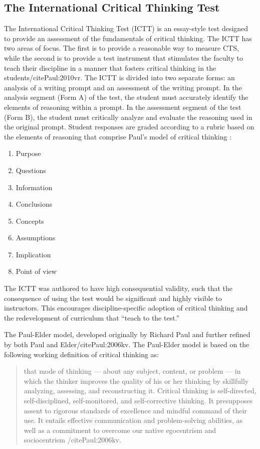 \subsection{The International Critical Thinking Test}

The International Critical Thinking Test (ICTT) is an essay-style test designed to provide an assessment of the fundamentals of critical thinking. The ICTT has two areas of focus. The first is to provide a reasonable way to measure CTS, while the second is to provide a test instrument that stimulates the faculty to teach their discipline in a manner that fosters critical thinking in the students/cite{Paul:2010vr}. The ICTT is divided into two separate forms: an analysis of a writing prompt and an assessment of the writing prompt. In the analysis segment (Form A) of the test, the student must accurately identify the elements of reasoning within a prompt. In the assessment segment of the test (Form B), the student must critically analyze and evaluate the reasoning used in the original prompt. Student responses are graded according to a rubric based on the elements of reasoning that comprise Paul’s model of critical thinking \cite{Paul:2006kv}:

\begin{enumerate}
\item Purpose
\item Questions
\item Information
\item Conclusions
\item Concepts
\item Assumptions
\item Implication
\item Point of view
\end{enumerate}

The ICTT was authored to have high consequential validity, such that the consequence of using the test would be significant and highly visible to instructors\cite{Paul:2007um}. This encourages discipline-specific adoption of critical thinking and the redevelopment of curriculum that “teach to the test.”

The Paul-Elder model, developed originally by Richard Paul and further refined by both Paul and Elder/cite{Paul:2006kv}. The Paul-Elder model is based on the following working definition of critical thinking as:

\begin{quote}
that mode of thinking — about any subject, content, or problem — in which the thinker improves the quality of his or her thinking by skillfully analyzing, assessing, and reconstructing it. Critical thinking is self-directed, self-disciplined, self-monitored, and self-corrective thinking. It presupposes assent to rigorous standards of excellence and mindful command of their use. It entails effective communication and problem-solving abilities, as well as a commitment to overcome our native egocentrism and sociocentrism /cite{Paul:2006kv}.
\end{quote}

